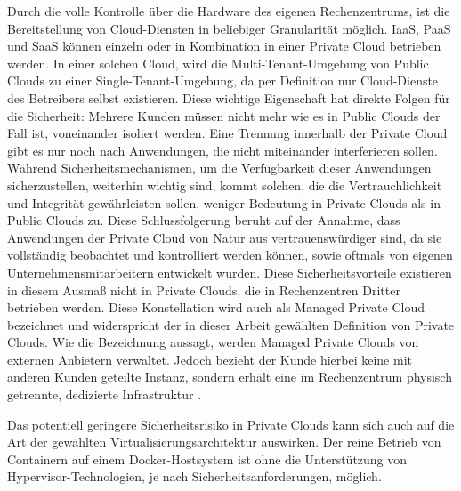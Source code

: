 \documentclass[../main.tex]{subfiles}
\begin{document}
    Durch die volle Kontrolle über die Hardware des eigenen Rechenzentrums, ist die Bereitstellung von Cloud-Diensten in beliebiger Granularität möglich. IaaS, PaaS und SaaS können einzeln oder in Kombination in einer Private Cloud betrieben werden. In einer solchen Cloud, wird die Multi-Tenant-Umgebung von Public Clouds zu einer Single-Tenant-Umgebung, da per Definition nur Cloud-Dienste des Betreibers selbst existieren. Diese wichtige Eigenschaft hat direkte Folgen für die Sicherheit:
    Mehrere Kunden müssen nicht mehr wie es in Public Clouds der Fall ist, voneinander isoliert werden. Eine Trennung innerhalb der Private Cloud gibt es nur noch nach Anwendungen, die nicht miteinander interferieren sollen. Während Sicherheitsmechanismen, um die Verfügbarkeit dieser Anwendungen sicherzustellen, weiterhin wichtig sind, kommt solchen, die die Vertrauchlichkeit und Integrität gewährleisten sollen, weniger Bedeutung in Private Clouds als in Public Clouds zu. Diese Schlussfolgerung beruht auf der Annahme, dass Anwendungen der Private Cloud von Natur aus vertrauenswürdiger sind, da sie vollständig beobachtet und kontrolliert werden können, sowie oftmals von eigenen Unternehmensmitarbeitern entwickelt wurden.
    Diese Sicherheitsvorteile existieren in diesem Ausmaß nicht in Private Clouds, die in Rechenzentren Dritter betrieben werden. Diese Konstellation wird auch als Managed Private Cloud bezeichnet und widerspricht der in dieser Arbeit gewählten Definition von Private Clouds. Wie die Bezeichnung aussagt, werden Managed Private Clouds von externen Anbietern verwaltet. Jedoch bezieht der Kunde hierbei keine mit anderen Kunden geteilte Instanz, sondern erhält eine im Rechenzentrum physisch getrennte, dedizierte Infrastruktur \cite{softlayerPrivateCloud}.

    Das potentiell geringere Sicherheitsrisiko in Private Clouds kann sich auch auf die Art der gewählten Virtualisierungsarchitektur auswirken. Der reine Betrieb von Containern auf einem Docker-Hostsystem ist ohne die Unterstützung von Hypervisor-Technologien, je nach Sicherheitsanforderungen, möglich.
\end{document}

